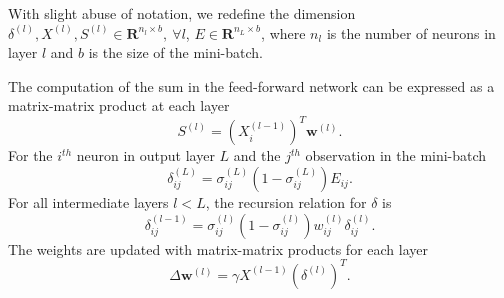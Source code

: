 \documentclass{article}
\newcommand{\be}{\begin{equation}}
\newcommand{\ee}{\end{equation}}
\begin{document}
With slight abuse of notation, we redefine the dimension $\delta^{(l)}, X^{(l)}, S^{(l)} \in \mathbf{R}^{n_l\times b},~\forall l$, $E \in \mathbf{R}^{n_L\times b}$, where $n_l$ is the number of neurons in layer $l$ and $b$ is the size of the mini-batch.

The computation of the sum in the feed-forward network can be expressed as a matrix-matrix product at each layer 
\be
S^{(l)} =  \left(X_i^{(l-1)}\right)^T \mathbf{w}^{(l)}.
\ee
For the $i^{th}$ neuron in output layer $L$ and the $j^{th}$ observation in the mini-batch 
\be
\delta^{(L)}_{ij} = \sigma_{ij}^{(L)}(1-\sigma_{ij}^{(L)}) E_{ij}. 
\ee
For all intermediate layers $l<L$, the recursion relation for $\delta$ is
\be
\delta^{(l-1)}_{ij} = \sigma_{ij}^{(l)}(1-\sigma_{ij}^{(l)}) w^{(l)}_{ij} \delta^{(l)}_{ij}.
\ee
The weights are updated with matrix-matrix products for each layer
\be
\Delta \mathbf{w}^{(l)} = \gamma X^{(l-1)}\left(\delta^{(l)}\right)^T.
\ee


%
%
%
\end{document}
